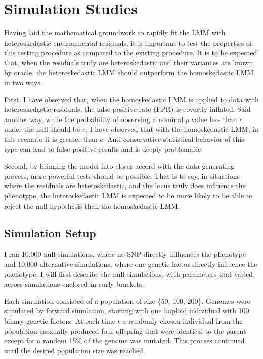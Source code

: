 \section{Simulation Studies}

Having laid the mathematical groundwork to rapidly fit the LMM with heteroskedastic environmental residuals, it is important to test the properties of this testing procedure as compared to the existing procedure.
It is to be expected that, when the residuals truly are heteroskedastic and their variances are known by oracle, the heteroskedastic LMM should outperform the homoskedastic LMM in two ways.

First, I have observed that, when the homoskedastic LMM is applied to data with heteroskedastic residuals, the false positive rate (FPR) is covertly inflated.
Said another way, while the probability of observing a nominal $p$ value less than $c$ under the null should be $c$, I have observed that with the homoskedastic LMM, in this scenario it is greater than $c$.
Anti-conservative statistical behavior of this type can lead to false positive results and is deeply problematic.

Second, by bringing the model into closer accord with the data generating process, more powerful tests should be possible.
That is to say, in situations where the residuals are heteroskedastic, and the locus truly does influence the phenotype, the heteroskedastic LMM is expected to be more likely to be able to reject the null hypothesis than the homoskedastic LMM.

\subsection{Simulation Setup}

I ran 10,000 null simulations, where no SNP directly influences the phenotype and 10,000 alternative simulations, where one genetic factor directly influence the phenotype.
I will first describe the null simulations, with parameters that varied across simulations enclosed in curly brackets.

Each simulation consisted of a population of size \{50, 100, 200\}.
Genomes were simulated by forward simulation, starting with one haploid individual with 100 binary genetic factors.
At each time $t$ a randomly chosen individual from the population asexually produced four offspring that were identical to the parent except for a random 15\% of the genome was mutated.
This process continued until the desired population size was reached.

